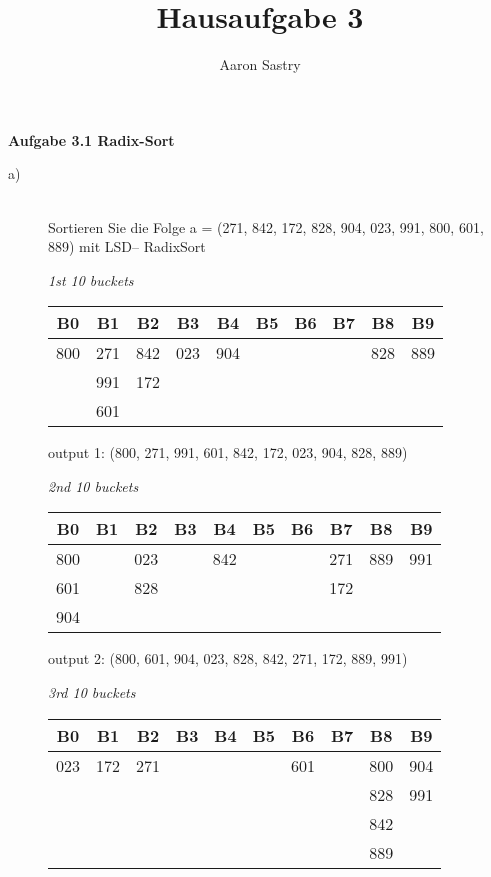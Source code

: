 \documentclass[12pt, a4paper, oneside]{article}
\title{Hausaufgabe 3}
\author{Aaron Sastry}
\begin{document}
	
	\maketitle
	
	\textbf{Aufgabe 3.1 Radix-Sort}
	\begin{description}
	
	\item [a)] \hfill \\
	Sortieren Sie die Folge a = (271, 842, 172, 828, 904, 023, 991, 800, 601, 889) mit LSD–
	RadixSort
	
	\emph{1st 10 buckets}
	\begin{tabular}{| c| c| c| c| c| c| c| c| c| c|}
		
		\hline
		B0 & B1 & B2 & B3 & B4 & B5 & B6 & B7 & B8 & B9 \\
		\hline\hline
		
		800 & 271 & 842 & 023 & 904 & & & & 828 & 889  \\
		    & 991 & 172 & & & & & & &  \\
		    & 601 & & & & & & & & \\ 
		\hline
	\end{tabular}

	output 1: (800, 271, 991, 601, 842, 172, 023, 904, 828, 889)
	\newline
	
	\emph{2nd 10 buckets}
	\begin{tabular}{| c| c| c| c| c| c| c| c| c| c|}
		
		\hline
		B0 & B1 & B2 & B3 & B4 & B5 & B6 & B7 & B8 & B9 \\
		\hline\hline
		
		800 & & 023 & & 842 & & & 271 & 889 & 991 \\
		601 & & 828 & &     & & & 172 & & \\
		904 & & & &     & & &     & & \\
		\hline
	\end{tabular}
	
	output 2: (800, 601, 904, 023, 828, 842, 271, 172, 889, 991)
	\newline
	
	\emph{3rd 10 buckets}
	\begin{tabular}{| c| c| c| c| c| c| c| c| c| c|}
		
		\hline
		B0 & B1 & B2 & B3 & B4 & B5 & B6 & B7 & B8 & B9 \\
		\hline\hline
		
		023 & 172 & 271 & & & & 601 & & 800 & 904 \\
		    &     &     & & & &     & & 828 & 991 \\
		    &     &     & & & &     & & 842 &     \\
		    &     &     & & & &     & & 889 &     \\
		

\end{tabular}
\end{description}
\end{document}
